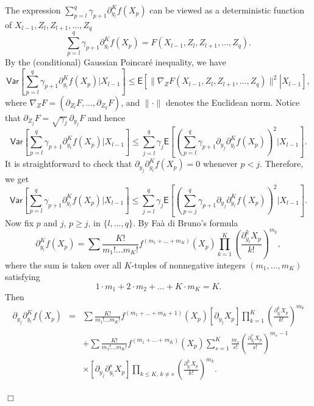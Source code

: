 \documentclass[bj]{imsart}
\newcommand{\proofendsign}{$\Box$}
\newenvironment{proof}{{\noindent \bf Proof }}
 {{\hspace*{\fill}\proofendsign\par\bigskip}}
\begin{document}
\begin{proof}
The expression
$\sum_{p=l}^q \gamma_{p+1} \partial_{y_l}^K f(X_p)$
can be viewed as a deterministic function of
$X_{l-1},Z_l,Z_{l+1},\ldots,Z_q$
$$
\sum_{p=l}^q \gamma_{p+1} \partial_{y_l}^K f(X_p)
=F(X_{l-1},Z_l,Z_{l+1},\ldots,Z_q).
$$
By the (conditional) Gaussian Poincar\'e inequality,
we have
$$
\mathsf{Var}\left[\sum_{p=l}^{q}\gamma_{p+1}\partial_{y_{l}}^{K}f\left(X_{p}\right)\Big|X_{l-1}\right]
\le\mathsf E\left[\left.
\|\nabla_Z F(X_{l-1},Z_l,Z_{l+1},\ldots,Z_q)\|^2
\right|X_{l-1}\right],
$$
where $\nabla_Z F=(\partial_{Z_l} F,\ldots,\partial_{Z_q} F)$,
and $\|\cdot\|$ denotes the Euclidean norm.
Notice that \(\partial_{Z_j} F=\sqrt{\gamma_j}\,\partial_{y_j} F\) and
hence
$$
\mathsf{Var}\left[\sum_{p=l}^{q}\gamma_{p+1}\partial_{y_{l}}^{K}f\left(X_{p}\right)\Big|X_{l-1}\right]\leq\sum_{j=l}^{q}\gamma_{j}\mathsf{E}\left[\left(\sum_{p=l}^{q}\gamma_{p+1}\partial_{y_{j}}\partial_{y_{l}}^{K}f\left(X_{p}\right)\right)^{2}\Big|X_{l-1}\right].
$$
It is straightforward to check that
$\partial_{y_j}\partial_{y_l}^K f(X_p)=0$
whenever $p<j$. Therefore, we get
\begin{equation}\label{eq:10062018a2}
\mathsf{Var}\left[\sum_{p=l}^{q}\gamma_{p+1}\partial_{y_{l}}^{K}f\left(X_{p}\right)\Big|X_{l-1}\right]\leq\sum_{j=l}^{q}\gamma_{j}\mathsf{E}\left[\left(\sum_{p=j}^{q}\gamma_{p+1}\partial_{y_{j}}\partial_{y_{l}}^{K}f\left(X_{p}\right)\right)^{2}\Big|X_{l-1}\right].
\end{equation}
Now fix $p$ and $j$, $p\ge j$, in $\{l,\ldots,q\}$.
By Fa\`a di Bruno's formula
\[
\partial_{y_{l}}^{K}f\left(X_{p}\right)=\sum\frac{K!}{m_{1}!\ldots m_{K}!}f^{(m_{1}+\ldots+m_{K})}(X_{p})\prod_{k=1}^{K}\left(\frac{\partial_{y_{l}}^{k}X_{p}}{k!}\right)^{m_{k}},
\]
where the sum is taken over all $K$-tuples of nonnegative integers
$(m_1,\ldots,m_K)$ satisfying
$$
1\cdot m_{1}+2\cdot m_{2}+\ldots+K\cdot m_{K}=K.
$$
Then
\begin{eqnarray*}
\partial_{y_{j}}\partial_{y_{l}}^{K}f\left(X_{p}\right)
&=&\sum\frac{K!}{m_{1}!\ldots m_{K}!}f^{(m_{1}+\ldots+m_{K}+1)}(X_{p})\left[\partial_{y_{j}}X_{p}\right]\prod_{k=1}^{K}\left(\frac{\partial_{y_{l}}^{k}X_{p}}{k!}\right)^{m_{k}} \\
&&+\sum\frac{K!}{m_{1}!\ldots m_{K}!}f^{(m_{1}+\ldots+m_{K})}(X_{p})
\sum_{s=1}^{K}\frac{m_{s}}{s!}
\left(\frac{\partial_{y_{l}}^{s}X_{p}}{s!}\right)^{m_{s}-1}
\\
&& \times\left[\partial_{y_{j}}\partial_{y_{l}}^{s}X_{p}\right]
\prod_{k\le K,\,k\neq s}\left(\frac{\partial_{y_{l}}^{k}X_{p}}{k!}\right)^{m_{k}}.

\end{eqnarray*}
\end{proof}
\end{document}
